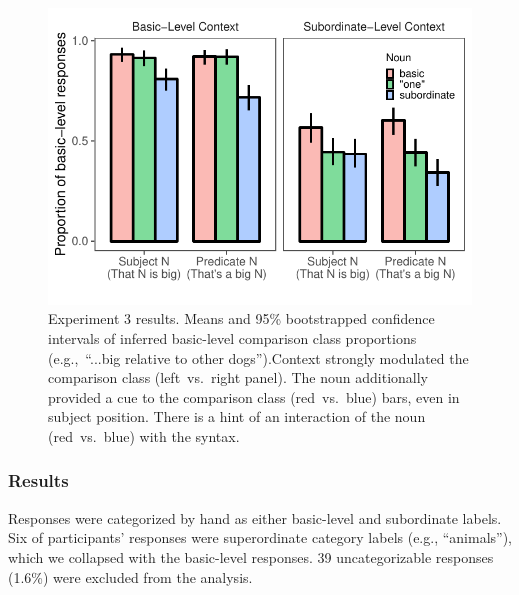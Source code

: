 \documentclass[10pt,letterpaper]{article}
\begin{document}
\begin{figure}[t]
	\begin{center}
		\includegraphics[width=\linewidth]{expt3-cc-inference-revised.pdf}
	\end{center}
	\vspace{-0.5cm}
	\caption{Experiment 3 results. Means and 95\% bootstrapped confidence intervals of inferred basic-level comparison class proportions (e.g.,~“...big relative to other dogs”).Context strongly modulated the comparison class (left~vs.~right panel). The noun additionally provided a cue to the comparison class (red~vs.~blue) bars, even in subject position. There is a hint of an interaction of the noun (red~vs.~blue) with the syntax. 
	}
	\vspace{-0.3cm}
	\label{cc-inference}
\end{figure}

\subsubsection{Results} 
Responses were categorized by hand as either basic-level and subordinate labels. 
Six of participants' responses were superordinate category labels (e.g., ``animals''), which we collapsed with the basic-level responses. 
39 uncategorizable responses (1.6\%) were excluded from the analysis. 
\end{document}
